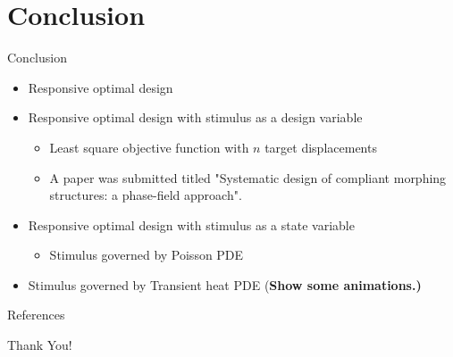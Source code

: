 \documentclass{beamer}
\begin{document}
\section{Conclusion}
\begin{frame}{Conclusion}
    \begin{itemize}
        \item Responsive optimal design
        \bigskip
        \item Responsive optimal design with stimulus as a design variable
        \bigskip
        \begin{itemize}
            \item Least square objective function with $n$ target displacements
            \item A paper was submitted titled "Systematic design of compliant morphing
            structures: a phase-field approach".
        \end{itemize}
        \bigskip
        \item Responsive optimal design with stimulus as a state variable
        \bigskip
        \begin{itemize}
            \item Stimulus governed by Poisson PDE
            \bigskip
        \end{itemize}
        \item Stimulus governed by Transient heat PDE (\bf Show some animations.)
    \end{itemize}
\end{frame}

\begin{frame}[shrink=40]{References} 
    
    
    \nocite{*}
\end{frame}

\begin{frame}
\Huge{\centerline{Thank You!}}
\end{frame}
\end{document}
